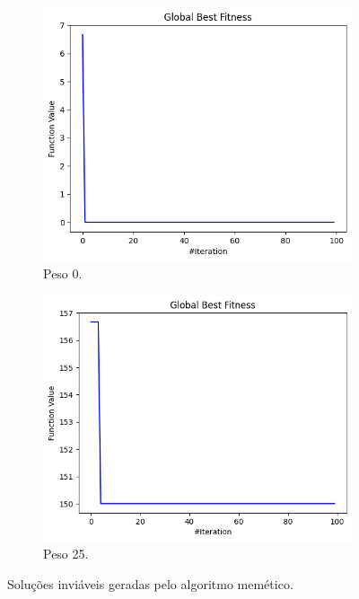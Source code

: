 \begin{figure}
    \centering
    \begin{subfigure}{.5\textwidth}
        \centering
        \includegraphics[width=1\linewidth]{images/non_viable/0/MA.png}
        \caption{Peso 0.}
    \end{subfigure}%
    \begin{subfigure}{.5\textwidth}
        \centering
        \includegraphics[width=1\linewidth]{images/non_viable/25/MA.png}
        \caption{Peso 25.}
    \end{subfigure}%
    \caption{Soluções inviáveis geradas pelo algoritmo memético.}%
    \label{fig:non-viable-ma}
\end{figure}
